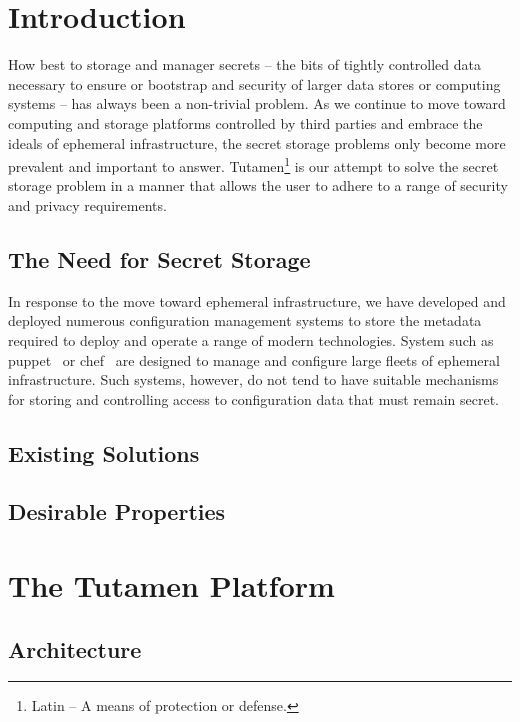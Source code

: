 \documentclass[letterpaper,twocolumn,10pt]{article}
\begin{document}
\section{Introduction}
\label{sec:intro}

How best to storage and manager secrets -- the bits of tightly
controlled data necessary to ensure or bootstrap and security of
larger data stores or computing systems -- has always been a
non-trivial problem. As we continue to move toward computing and
storage platforms controlled by third parties and embrace the ideals
of ephemeral infrastructure, the secret storage problems only become
more prevalent and important to answer. Tutamen\footnote{Latin -- A
  means of protection or defense.} is our attempt to solve the secret
storage problem in a manner that allows the user to adhere to a range
of security and privacy requirements.


\subsection{The Need for Secret Storage}

In response to the move toward ephemeral infrastructure, we have
developed and deployed numerous configuration management systems to
store the metadata required to deploy and operate a range of modern
technologies. System such as puppet~\cite{puppet} or chef~\cite{chef}
are designed to manage and configure large fleets of ephemeral
infrastructure. Such systems, however, do not tend to have suitable
mechanisms for storing and controlling access to configuration data
that must remain secret.

\subsection{Existing Solutions}

\cite{vault}
\cite{confidant}
\cite{openstack-barbican}
\cite{keywhiz}

\subsection{Desirable Properties}

\section{The Tutamen Platform}
\label{sec:tutamen}

\subsection{Architecture}
\end{document}
